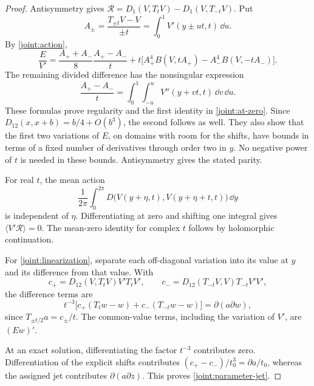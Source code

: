 \begin{proof}
Antisymmetry gives
\(\mathcal R=D_1(V,T_tV)-D_1(V,T_{-t}V)\).  Put
\[
 A_\pm=\frac{T_{\pm t}V-V}{\pm t}
       =\int_0^1 V'(y\pm ut,t)\,\dd u.
\]
By \eqref{joint:action},
\begin{equation}
 \frac{E}{V'}=
 \frac{A_++A_-}{8}\frac{A_+-A_-}{t}
 +t\bigl[A_+^4B(V,tA_+)-A_-^4B(V,-tA_-)\bigr].
 \label{joint:regular-formula}
\end{equation}
The remaining divided difference has the nonsingular expression
\[
 \frac{A_+-A_-}{t}
 =\int_0^1\int_{-u}^{u}V''(y+vt,t)\,\dd v\,\dd u.
\]
These formulas prove regularity and the first identity in
\eqref{joint:at-zero}.  Since
\(D_{12}(x,x+b)=b/4+O(b^3)\), the second follows as well.  They also
show that the first two variations of \(E\), on domains with room for
the shifts, have bounds in terms of a fixed number of derivatives
through order two in \(y\).  No negative power of \(t\) is needed in
these bounds.  Antisymmetry gives the stated parity.

For real \(t\), the mean action
\[
 \frac1{2\pi}\int_0^{2\pi}
 D\bigl(V(y+\eta,t),V(y+\eta+t,t)\bigr)\,\dd y
\]
is independent of \(\eta\).  Differentiating at zero and shifting one
integral gives \(\langle V'\mathcal R\rangle=0\).  The mean-zero
identity for complex \(t\) follows by holomorphic continuation.

For \eqref{joint:linearization}, separate each off-diagonal variation
into its value at \(y\) and its difference from that value.  With
\[
 c_+=D_{12}(V,T_tV)V'T_tV',\qquad
 c_-=D_{12}(T_{-t}V,V)T_{-t}V'V',
\]
the difference terms are
\[
 t^{-3}\bigl[c_+(T_tw-w)+c_-(T_{-t}w-w)\bigr]
 =\partial(a\partial w),
\]
since \(T_{\pm t/2}a=c_\pm/t\).  The common-value terms, including
the variation of \(V'\), are \((Ew)'\).

At an exact solution, differentiating the factor \(t^{-3}\) contributes
zero.  Differentiation of the explicit shifts contributes
\((c_+-c_-)/t_0^3=\partial a/t_0\), whereas the assigned jet contributes
\(\partial(a\partial z)\).  This proves
\eqref{joint:parameter-jet}.
\end{proof}

